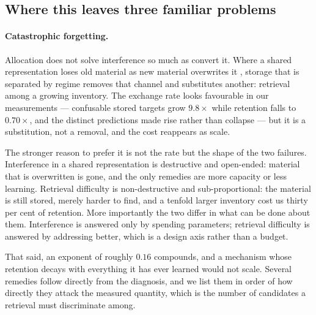\documentclass[11pt,a4paper]{article}
\begin{document}
\subsection{Where this leaves three familiar problems}

\paragraph{Catastrophic forgetting.}
Allocation does not solve interference so much as convert it. Where a shared
representation loses old material as new material overwrites it
\citep{mccloskey1989catastrophic}, storage that is separated by regime removes
that channel and substitutes another: retrieval among a growing inventory. The
exchange rate looks favourable in our measurements --- confusable stored targets
grow $9.8\times$ while retention falls to $0.70\times$, and the distinct
predictions made rise rather than collapse --- but it is a substitution, not a
removal, and the cost reappears as scale.

The stronger reason to prefer it is not the rate but the shape of the two
failures. Interference in a shared representation
is destructive and open-ended: material that is overwritten is gone, and the
only remedies are more capacity or less learning. Retrieval difficulty is
non-destructive and sub-proportional: the material is still stored, merely
harder to find, and a tenfold larger inventory cost us thirty per cent of
retention. More importantly the two differ in what can be done about them.
Interference is answered only by spending parameters; retrieval difficulty is
answered by addressing better, which is a design axis rather than a budget.

That said, an exponent of roughly $0.16$ compounds, and a mechanism whose
retention decays with everything it has ever learned would not scale. Several
remedies follow directly from the diagnosis, and we list them in order of how
directly they attack the measured quantity, which is the number of candidates a
retrieval must discriminate among.
\end{document}
